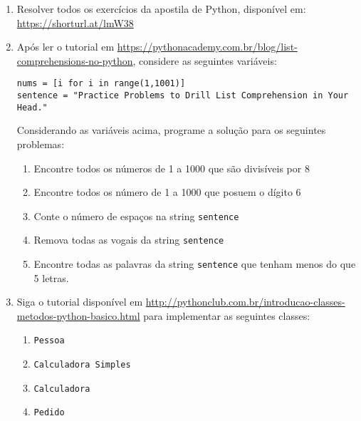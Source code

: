 \documentclass{article}
\begin{document}
\begin{enumerate}
    \item Resolver todos os exercícios da apostila de Python, disponível em: \url{https://shorturl.at/lmW38}
    \item Após ler o tutorial em \url{https://pythonacademy.com.br/blog/list-comprehensions-no-python}, considere as seguintes variáveis:
    
    \texttt{nums = [i for i in range(1,1001)]}\\
    \texttt{sentence = "Practice Problems to Drill List Comprehension in Your Head."}
    
    Considerando as variáveis acima, programe a solução para os seguintes problemas:
    
    \begin{enumerate}
    \item Encontre todos os números de 1 a 1000 que são divisíveis por 8
    \item Encontre todos os número de 1 a 1000 que posuem o dígito 6
    \item Conte o número de espaços na string \texttt{sentence}
    \item Remova todas as vogais da string \texttt{sentence}
    \item Encontre todas as palavras da string \texttt{sentence} que tenham menos do que 5 letras.
    \end{enumerate}
    
    \item Siga o tutorial disponível em \url{http://pythonclub.com.br/introducao-classes-metodos-python-basico.html} para implementar as seguintes classes:
    \begin{enumerate}
        \item \texttt{Pessoa}
        \item \texttt{Calculadora Simples}
        \item \texttt{Calculadora}
        \item \texttt{Pedido}
    \end{enumerate}
    

\end{enumerate}

%
%
\end{document}
